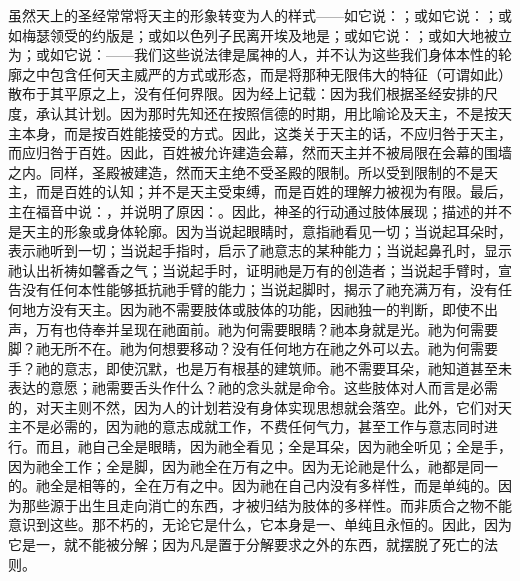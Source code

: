 \par

虽然天上的圣经常常将天主的形象转变为人的样式——如它说：；或如它说：；或如梅瑟领受的约版是；或如以色列子民离开埃及地是；或如它说：；或如大地被立为；或如它说：——我们这些说法律是属神的人，并不认为这些我们身体本性的轮廓之中包含任何天主威严的方式或形态，而是将那种无限伟大的特征（可谓如此）散布于其平原之上，没有任何界限。因为经上记载：因为我们根据圣经安排的尺度，承认其计划。因为那时先知还在按照信德的时期，用比喻论及天主，不是按天主本身，而是按百姓能接受的方式。因此，这类关于天主的话，不应归咎于天主，而应归咎于百姓。因此，百姓被允许建造会幕，然而天主并不被局限在会幕的围墙之内。同样，圣殿被建造，然而天主绝不受圣殿的限制。所以受到限制的不是天主，而是百姓的认知；并不是天主受束缚，而是百姓的理解力被视为有限。最后，主在福音中说：，并说明了原因：。因此，神圣的行动通过肢体展现；描述的并不是天主的形象或身体轮廓。因为当说起眼睛时，意指祂看见一切；当说起耳朵时，表示祂听到一切；当说起手指时，启示了祂意志的某种能力；当说起鼻孔时，显示祂认出祈祷如馨香之气；当说起手时，证明祂是万有的创造者；当说起手臂时，宣告没有任何本性能够抵抗祂手臂的能力；当说起脚时，揭示了祂充满万有，没有任何地方没有天主。因为祂不需要肢体或肢体的功能，因祂独一的判断，即使不出声，万有也侍奉并呈现在祂面前。祂为何需要眼睛？祂本身就是光。祂为何需要脚？祂无所不在。祂为何想要移动？没有任何地方在祂之外可以去。祂为何需要手？祂的意志，即使沉默，也是万有根基的建筑师。祂不需要耳朵，祂知道甚至未表达的意愿；祂需要舌头作什么？祂的念头就是命令。这些肢体对人而言是必需的，对天主则不然，因为人的计划若没有身体实现思想就会落空。此外，它们对天主不是必需的，因为祂的意志成就工作，不费任何气力，甚至工作与意志同时进行。而且，祂自己全是眼睛，因为祂全看见；全是耳朵，因为祂全听见；全是手，因为祂全工作；全是脚，因为祂全在万有之中。因为无论祂是什么，祂都是同一的。祂全是相等的，全在万有之中。因为祂在自己内没有多样性，而是单纯的。因为那些源于出生且走向消亡的东西，才被归结为肢体的多样性。而非质合之物不能意识到这些。那不朽的，无论它是什么，它本身是一、单纯且永恒的。因此，因为它是一，就不能被分解；因为凡是置于分解要求之外的东西，就摆脱了死亡的法则。\par

